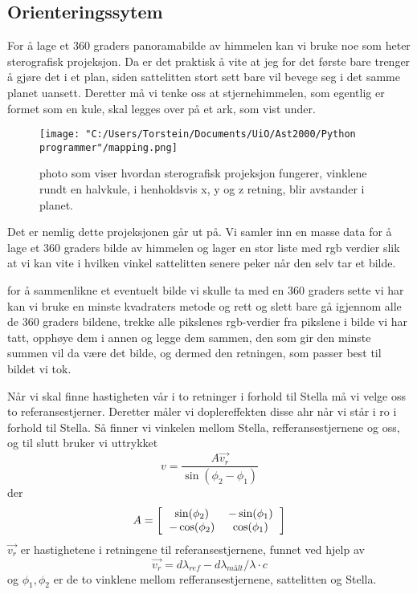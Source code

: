 \documentclass[11pt, A4paper, norsk]{report}
\begin{document}
		\subsection{Orienteringssytem}
For å lage et 360 graders panoramabilde av himmelen kan vi bruke noe som heter sterografisk projeksjon. Da er det praktisk å vite at jeg for det første bare trenger å gjøre det i et plan, siden sattelitten stort sett bare vil bevege seg i det samme planet uansett. Deretter må vi tenke oss at stjernehimmelen, som egentlig er formet som en kule, skal legges over på et ark, som vist under.

\begin{figure}[H]
\texttt{[image: "C:/Users/Torstein/Documents/UiO/Ast2000/Python programmer"/mapping.png]}
\caption{photo som viser hvordan sterografisk projeksjon fungerer, vinklene rundt en halvkule, i henholdsvis x, y og z retning, blir avstander i planet.}
\end{figure}
Det er nemlig dette projeksjonen går ut på. Vi samler inn en masse data for å lage et 360 graders bilde av himmelen og lager en stor liste med rgb verdier slik at vi kan vite i hvilken vinkel sattelitten senere peker når den selv tar et bilde.

for å sammenlikne et eventuelt bilde vi skulle ta med en 360 graders sette vi har kan vi bruke en minste kvadraters metode og rett og slett bare gå igjennom alle de 360 graders bildene, trekke alle pikslenes rgb-verdier fra pikslene i bilde vi har tatt, opphøye dem i annen og legge dem sammen, den som gir den minste summen vil da være det bilde, og dermed den retningen, som passer best til bildet vi tok.

Når vi skal finne hastigheten vår i to retninger i forhold til Stella må vi velge oss to referansestjerner. Deretter måler vi doplereffekten disse ahr når vi står i ro i forhold til Stella. Så finner vi vinkelen mellom Stella, refferansestjernene og oss, og til slutt bruker vi uttrykket $$v = \frac{A \vec{v_r}}{\sin(\phi_2 - \phi_1)}$$ der 
\begin{equation*}
A = \left[
	\begin{tabular}{ cc }
$\sin(\phi_2)$ &$ - \sin(\phi_1) $\\
$- \cos(\phi_2) $& $\cos(\phi_1)$
	\end{tabular}\right]
\end{equation*}
$\vec{v_r}$ er hastighetene i retningene til referansestjernene, funnet ved hjelp av $$\vec{v_r} = d\lambda_{ref} - d\lambda_{målt}/\lambda \cdot c$$ og $\phi_1, \phi_2$ er de to vinklene mellom refferansestjernene, sattelitten og Stella. \cite{part4}
\end{document}
